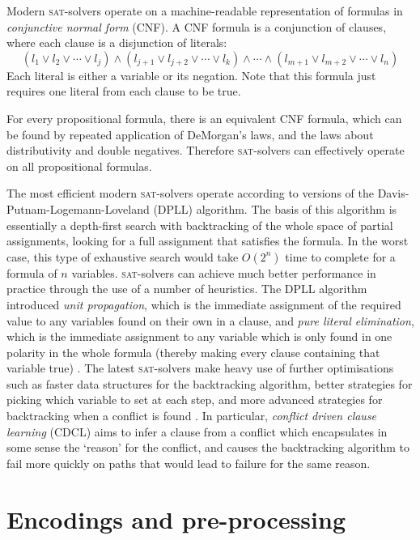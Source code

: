 \documentclass[pdftex,11pt,a4]{article}
\newcommand{\sat}{\textsc{sat}}
\begin{document}
Modern \sat{}-solvers operate on a machine-readable representation of formulas in \emph{conjunctive normal form} (CNF). A CNF formula is a conjunction of clauses, where each clause is a disjunction of literals:
\[(l_1 \vee l_2 \vee \cdots \vee l_j) \wedge (l_{j+1} \vee l_{j+2} \vee \cdots \vee l_k) \wedge \cdots \wedge (l_{m+1} \vee l_{m+2} \vee \cdots \vee l_n)\]
Each literal is either a variable or its negation. Note that this formula just requires one literal from each clause to be true.

For every propositional formula, there is an equivalent CNF formula, which can be found by repeated application of DeMorgan's laws, and the laws about distributivity and double negatives. Therefore \sat{}-solvers can effectively operate on all propositional formulas.

The most efficient modern \sat{}-solvers operate according to versions of the Davis-Putnam-Logemann-Loveland (DPLL) algorithm. The basis of this algorithm is essentially a depth-first search with backtracking of the whole space of partial assignments, looking for a full assignment that satisfies the formula. In the worst case, this type of exhaustive search would take $O(2^n)$ time to complete for a formula of $n$ variables. \sat{}-solvers can achieve much better performance in practice through the use of a number of heuristics. The DPLL algorithm introduced \emph{unit propagation}, which is the immediate assignment of the required value to any variables found on their own in a clause, and \emph{pure literal elimination}, which is the immediate assignment to any variable which is only found in one polarity in the whole formula (thereby making every clause containing that variable true) \cite{Davis:1962}. The latest \sat{}-solvers make heavy use of further optimisations such as faster data structures for the backtracking algorithm, better strategies for picking which variable to set at each step, and more advanced strategies for backtracking when a conflict is found \cite{Een:2003}. In particular, \emph{conflict driven clause learning} (CDCL) aims to infer a clause from a conflict which encapsulates in some sense the `reason' for the conflict, and causes the backtracking algorithm to fail more quickly on paths that would lead to failure for the same reason.

\section{Encodings and pre-processing}
\end{document}
